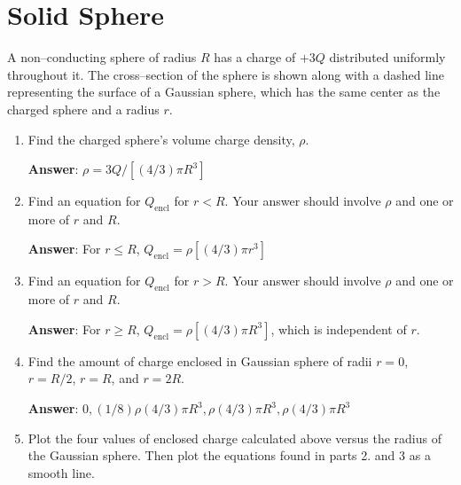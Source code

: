\documentclass{article}
\newcommand{\ds}[0]{\displaystyle}
\begin{document}
\newpage

\section{Solid Sphere}

A non--conducting sphere of radius $R$ has a charge of $+3Q$ distributed uniformly throughout it. The cross--section of the sphere is shown along with a dashed line representing the surface of a Gaussian sphere, which has the same center as the charged sphere and a radius $r$.



\begin{enumerate}

  \item Find the charged sphere's volume charge density, $\rho$.

        \ifsolutions
          \textbf{Answer}: $\ds \rho=3Q/[(4/3)\pi R^3]$
        \else
          \vskip 36.135pt
        \fi

  \item Find an equation for $Q_{\text{encl}}$ for $r<R$. Your answer should involve $\rho$ and one or more of $r$ and $R$.

        \ifsolutions
          \textbf{Answer}: For $r \le R$, $Q_{\text{encl}}=\rho [(4/3)\pi r^3]$
        \else
          \vskip 36.135pt
        \fi

  \item Find an equation for $Q_{\text{encl}}$ for $r>R$. Your answer should involve $\rho$ and one or more of $r$ and $R$.

        \ifsolutions
          \textbf{Answer}: For $r \ge R$,  $Q_{\text{encl}}=\rho [(4/3)\pi R^3]$, which is independent of $r$.
        \else
          \vskip 36.135pt
        \fi

  \item Find the amount of charge enclosed in Gaussian sphere of radii $r=0$, $r=R/2$, $r=R$, and $r=2R$.

        \ifsolutions
          \textbf{Answer}: $0, (1/8)\rho (4/3)\pi R^3, \rho(4/3)\pi R^3, \rho(4/3)\pi R^3$
        \else
          \vskip 36.135pt
        \fi

  \item Plot the four values of enclosed charge calculated above versus the radius of the Gaussian sphere. Then plot the equations found in parts 2. and 3 as a smooth line.

        \ifsolutions
          
        \fi

\end{enumerate}
\end{document}
